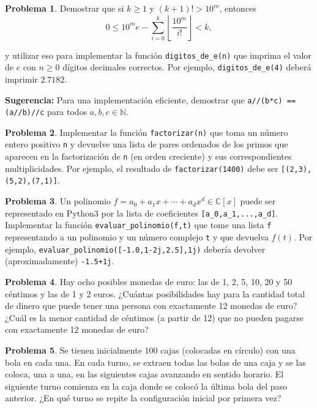 \documentclass[a4paper, 11pt]{article}
\newcommand{\NN}{\mathbb{N}}
\newcommand{\CC}{\mathbb{C}}
\newcounter{numerodetema}
\theoremstyle{plain}
\theoremstyle{definition}
\newtheorem{prob}{Problema}[numerodetema]
\begin{document}
\begin{prob}
Demostrar que si $k\geq 1$ y $(k+1)!>10^m$, entonces
\[
   0\leq 10^me-\sum_{i=0}^k\left\lfloor\frac{10^m}{i!}\right\rfloor<k,
\]

y utilizar eso para implementar la función \texttt{digitos\_de\_e(n)}
que imprima el valor de $e$ con $n\geq 0$ dígitos decimales correctos.
Por ejemplo, \texttt{digitos\_de\_e(4)} deberá imprimir $2.7182$.

\smallskip

{\bf Sugerencia:} Para una implementación eficiente, demostrar que
\texttt{a//(b*c) == (a//b)//c} para todos $a,b,c\in\NN$.
\end{prob}

\begin{prob}
Implementar la función \texttt{factorizar(n)} que toma un número entero positivo
\texttt{n} y devuelve una lista de pares ordenados de los primos que aparecen en
la factorización de \texttt{n} (en orden creciente) y sus correspondientes
multiplicidades. Por ejemplo, el resultado de \texttt{factorizar(1400)} debe ser
\texttt{[(2,3),(5,2),(7,1)]}.
\end{prob}

\begin{prob}\label{prob-eval-poly}
Un polinomio $f=a_0+a_1x+\cdots+a_dx^d\in\CC[x]$ puede ser representado en
Python3 por la lista de coeficientes \texttt{[a\_0,a\_1,...,a\_d]}. Implementar
la función \texttt{evaluar\_polinomio(f,t)} que tome una lista \texttt{f}
representando a un polinomio y un número complejo \texttt{t} y que devuelva
$f(t)$. Por ejemplo, \texttt{evaluar\_polinomio([-1.0,1-2j,2.5],1j)}
debería devolver (aproximadamente) \texttt{-1.5+1j}.
\end{prob}

\begin{prob}
Hay ocho posibles monedas de euro: las de 1, 2, 5, 10, 20 y 50 céntimos y las
de 1 y 2 euros. ¿Cuántas posibilidades hay para la cantidad total de dinero
que puede tener una persona con exactamente 12 monedas de euro? ¿Cuál es la
menor cantidad de céntimos (a partir de 12) que no pueden pagarse con exactamente
12 monedas de euro?
\end{prob}

\begin{prob}
Se tienen inicialmente $100$ cajas (colocadas en círculo) con una bola en cada una.
En cada turno, se extraen todas las bolas de una caja y se las coloca, una a
una, en las siguientes cajas avanzando en sentido horario. El siguiente turno
comienza en la caja donde se colocó la última bola del paso anterior. ¿En qué
turno se repite la configuración inicial por primera vez?
\end{prob}
\end{document}
